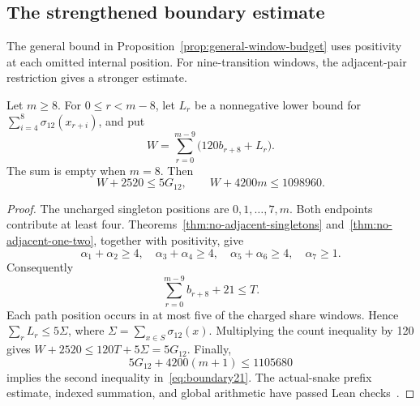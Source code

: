 \subsection{The strengthened boundary estimate}\label{sec:boundary21}
The general bound in Proposition~\ref{prop:general-window-budget} uses positivity at each omitted internal position. For nine-transition windows, the adjacent-pair restriction gives a stronger estimate.

\begin{proposition}\label{prop:boundary21}
Let $m\ge8$. For $0\le r<m-8$, let $L_r$ be a nonnegative lower bound for
$\sum_{i=4}^{8}\sigma_{12}(x_{r+i})$, and put
\[
W=\sum_{r=0}^{m-9}\bigl(120b_{r+8}+L_r\bigr).
\]
The sum is empty when $m=8$. Then
\begin{equation}\label{eq:boundary21}
W+2520\le5G_{12},\qquad W+4200m\le1098960.
\end{equation}
\end{proposition}
\begin{proof}
The uncharged singleton positions are $0,1,\ldots,7,m$. Both endpoints contribute at least four. Theorems~\ref{thm:no-adjacent-singletons} and~\ref{thm:no-adjacent-one-two}, together with positivity, give
\[
\alpha_1+\alpha_2\ge4,\quad
\alpha_3+\alpha_4\ge4,\quad
\alpha_5+\alpha_6\ge4,\quad\alpha_7\ge1.
\]
Consequently
\[
\sum_{r=0}^{m-9}b_{r+8}+21\le T.
\]
Each path position occurs in at most five of the charged share windows. Hence $\sum_rL_r\le5\Sigma$, where $\Sigma=\sum_{x\in S}\sigma_{12}(x)$. Multiplying the count inequality by 120 gives $W+2520\le120T+5\Sigma=5G_{12}$. Finally,
\[
5G_{12}+4200(m+1)\le1105680
\]
implies the second inequality in~\eqref{eq:boundary21}. The actual-snake prefix estimate, indexed summation, and global arithmetic have passed Lean checks~\cite{boundaryarchive}.
\end{proof}

